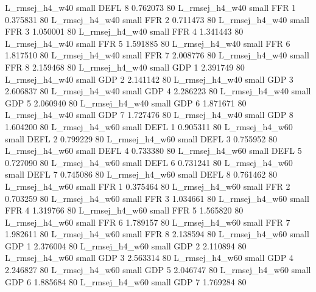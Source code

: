 L_rmsej_h4_w40      small     DEFL                 8 0.762073 80
L_rmsej_h4_w40      small      FFR                 1 0.375831 80
L_rmsej_h4_w40      small      FFR                 2 0.711473 80
L_rmsej_h4_w40      small      FFR                 3 1.050001 80
L_rmsej_h4_w40      small      FFR                 4 1.341443 80
L_rmsej_h4_w40      small      FFR                 5 1.591885 80
L_rmsej_h4_w40      small      FFR                 6 1.817510 80
L_rmsej_h4_w40      small      FFR                 7 2.008776 80
L_rmsej_h4_w40      small      FFR                 8 2.159468 80
L_rmsej_h4_w40      small      GDP                 1 2.391749 80
L_rmsej_h4_w40      small      GDP                 2 2.141142 80
L_rmsej_h4_w40      small      GDP                 3 2.606837 80
L_rmsej_h4_w40      small      GDP                 4 2.286223 80
L_rmsej_h4_w40      small      GDP                 5 2.060940 80
L_rmsej_h4_w40      small      GDP                 6 1.871671 80
L_rmsej_h4_w40      small      GDP                 7 1.727476 80
L_rmsej_h4_w40      small      GDP                 8 1.604200 80
L_rmsej_h4_w60      small     DEFL                 1 0.905311 80
L_rmsej_h4_w60      small     DEFL                 2 0.799229 80
L_rmsej_h4_w60      small     DEFL                 3 0.755952 80
L_rmsej_h4_w60      small     DEFL                 4 0.733380 80
L_rmsej_h4_w60      small     DEFL                 5 0.727090 80
L_rmsej_h4_w60      small     DEFL                 6 0.731241 80
L_rmsej_h4_w60      small     DEFL                 7 0.745086 80
L_rmsej_h4_w60      small     DEFL                 8 0.761462 80
L_rmsej_h4_w60      small      FFR                 1 0.375464 80
L_rmsej_h4_w60      small      FFR                 2 0.703259 80
L_rmsej_h4_w60      small      FFR                 3 1.034661 80
L_rmsej_h4_w60      small      FFR                 4 1.319766 80
L_rmsej_h4_w60      small      FFR                 5 1.565820 80
L_rmsej_h4_w60      small      FFR                 6 1.789157 80
L_rmsej_h4_w60      small      FFR                 7 1.982611 80
L_rmsej_h4_w60      small      FFR                 8 2.138594 80
L_rmsej_h4_w60      small      GDP                 1 2.376004 80
L_rmsej_h4_w60      small      GDP                 2 2.110894 80
L_rmsej_h4_w60      small      GDP                 3 2.563314 80
L_rmsej_h4_w60      small      GDP                 4 2.246827 80
L_rmsej_h4_w60      small      GDP                 5 2.046747 80
L_rmsej_h4_w60      small      GDP                 6 1.885684 80
L_rmsej_h4_w60      small      GDP                 7 1.769284 80
